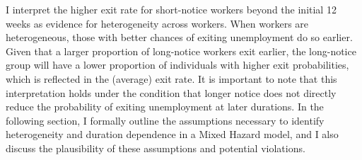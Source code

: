 \documentclass{div}
\begin{document}
I interpret the higher exit rate for short-notice workers beyond the initial 12 weeks as evidence for heterogeneity across workers. When workers are heterogeneous, those with better chances of exiting unemployment do so earlier. Given that a larger proportion of long-notice workers exit earlier, the long-notice group will have a lower proportion of individuals with higher exit probabilities, which is reflected in the (average) exit rate. It is important to note that this interpretation holds under the condition that longer notice does not directly reduce the probability of exiting unemployment at later durations. In the following section, I formally outline the assumptions necessary to identify heterogeneity and duration dependence in a Mixed Hazard model, and I also discuss the plausibility of these assumptions and potential violations.




\end{document}
